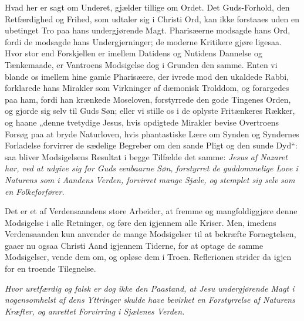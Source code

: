 \documentclass[12pt,a4paper]{book}
\begin{document}
Hvad her er sagt om Underet, gjælder tillige om Ordet. Det Guds-Forhold, den
Retfærdighed og Frihed, som udtaler sig i Christi Ord, kan ikke forstaaes uden en
ubetinget Tro paa hans undergjørende Magt. Pharisæerne modsagde hans Ord, fordi de
modsagde hans Undergjerninger; de moderne Kritikere gjøre ligesaa. Hvor stor end
Forskjellen er imellem Datidens og Nutidens Dannelse og Tænkemaade, er Vantroens
Modsigelse dog i Grunden den samme. Enten vi blande os imellem hine gamle Pharisæere,
der ivrede mod den ukaldede Rabbi, forklarede hans Mirakler som Virkninger af dæmonisk
Trolddom, og forargedes paa ham, fordi han krænkede Moseloven, forstyrrede den gode
Tingenes Orden, og gjorde sig selv til Guds Søn; eller vi stille os i de oplyste
Fritænkeres Rækker, og haane „denne tvetydige Jesus, hvis opdigtede Mirakler bevise
Overtroens Forsøg paa at bryde Naturloven, hvis phantastiske Lære om Synden og
Syndernes Forladelse forvirrer de sædelige Begreber om den sande Pligt og den sunde
Dyd“: saa bliver Modsigelsens Resultat i begge Tilfælde det samme:
\emph{Jesus af Nazaret har, ved at udgive sig for Guds eenbaarne Søn, forstyrret de
guddommelige Love i Naturens som i Aandens Verden, forvirret mange Sjæle, og stemplet
sig selv som en Folkeforfører.}

Det er et af Verdensaandens store Arbeider, at fremme og mangfoldiggjøre denne
Modsigelse i alle Retninger, og føre den igjennem alle Kriser. Men, imedens
Verdensaanden kun anvender de mange Modsigelser til at bekræfte Fornegtelsen, gaaer nu
ogsaa Christi Aand igjennem Tiderne, for at optage de samme Modsigelser, vende dem om,
og opløse dem i Troen. Reflerionen strider da igjen for en troende Tilegnelse.

\emph{Hvor uretfærdig og falsk er dog ikke den Paastand, at Jesu undergjørende Magt i
nogensomhelst af dens Yttringer skulde have bevirket en Forstyrrelse af Naturens
Kræfter, og anrettet Forvirring i Sjælenes Verden.}
\end{document}
